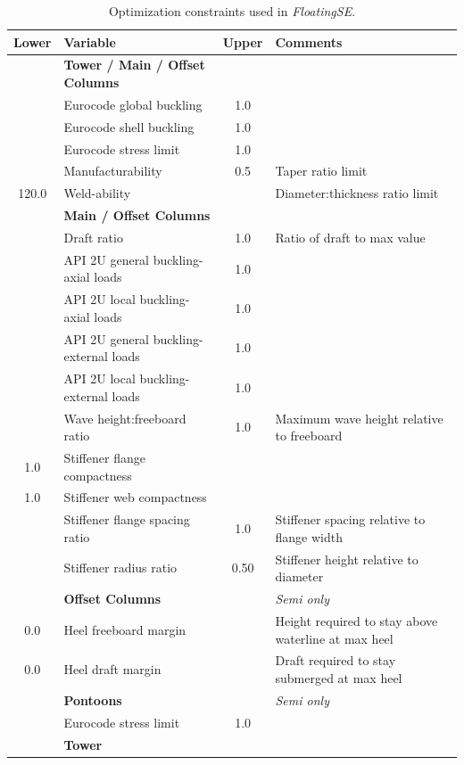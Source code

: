 \begin{table}[htbp] \begin{center}
    \caption{Optimization constraints used in \textit{FloatingSE}.}
    \label{tbl:constraints}
    {\footnotesize
  \begin{tabular}{ c l c l} \hline
    \textbf{Lower} & \textbf{Variable} & \textbf{Upper} & \textbf{Comments}\\
\hline \hline
 & \textbf{Tower / Main / Offset Columns} &  & \\
 & Eurocode global buckling & 1.0 & \\
 & Eurocode shell buckling & 1.0 & \\
 & Eurocode stress limit & 1.0 & \\
  & Manufacturability & 0.5 & Taper ratio limit\\
  120.0 & Weld-ability &  & Diameter:thickness ratio limit\\
\hline & \textbf{Main / Offset Columns} &  & \\
 & Draft ratio & 1.0 & Ratio of draft to max value\\
 & API 2U general buckling- axial loads & 1.0 & \\
 & API 2U local buckling- axial loads & 1.0 & \\
 & API 2U general buckling- external loads & 1.0 & \\
 & API 2U local buckling- external loads & 1.0 & \\
 & Wave height:freeboard ratio & 1.0 & Maximum wave height relative to freeboard\\
  1.0 & Stiffener flange compactness &  & \\
  1.0 & Stiffener web compactness &  & \\
 & Stiffener flange spacing ratio & 1.0 & Stiffener spacing relative to flange width\\
 & Stiffener radius ratio & 0.50 & Stiffener height relative to diameter\\
\hline & \textbf{Offset Columns} &  & \textit{Semi only}\\
  0.0 & Heel freeboard margin &  & Height required to stay above waterline at max heel\\
  0.0 & Heel draft margin &  & Draft required to stay submerged at max heel\\
\hline & \textbf{Pontoons} &  & \textit{Semi only}\\
 & Eurocode stress limit & 1.0 &\\
\hline & \textbf{Tower} &  & \\

\end{tabular}}
\end{center}
\end{table}
